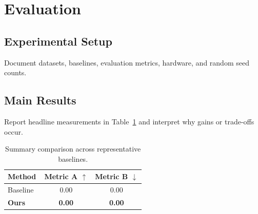 \section{Evaluation}
\label{sec:eval}


\subsection{Experimental Setup}
\label{subsec:setup}

Document datasets, baselines, evaluation metrics, hardware, and random seed counts.

\subsection{Main Results}
\label{subsec:results}

Report headline measurements in Table~\ref{tab:results} and interpret why gains or trade-offs occur.

\begin{table}[t]
  \centering
  \caption{Summary comparison across representative baselines.}
  \label{tab:results}
  \begin{tabular}{lcc}
    \toprule
    Method & Metric A $\uparrow$ & Metric B $\downarrow$ \\
    \midrule
    Baseline~\cite{smith2024example} & 0.00 & 0.00 \\
    \textbf{Ours}                    & \textbf{0.00} & \textbf{0.00} \\
    \bottomrule
  \end{tabular}
\end{table}

